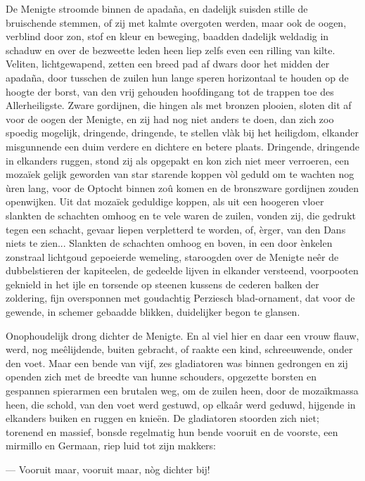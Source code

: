 \documentclass[a4paper, 12pt, oneside, dutch]{article}
\begin{document}
De Menigte stroomde binnen de apadaña, en dadelijk suisden stille de bruischende stemmen, of zij met kalmte overgoten werden, maar ook de oogen, verblind door zon, stof en kleur en beweging, baadden dadelijk weldadig in schaduw en over de bezweette leden heen liep zelfs even een rilling van kilte. Veliten, lichtgewapend, zetten een breed pad af dwars door het midden der apadaña, door tusschen de zuilen hun lange speren horizontaal te houden op de hoogte der borst, van den vrij gehouden hoofdingang tot de trappen toe des Allerheiligste. Zware gordijnen, die hingen als met bronzen plooien, sloten dit af voor de oogen der Menigte, en zij had nog niet anders te doen, dan zich zoo spoedig mogelijk, dringende, dringende, te stellen vlàk bij het heiligdom, elkander misgunnende een duim verdere en dichtere en betere plaats. Dringende, dringende in elkanders ruggen, stond zij als opgepakt en kon zich niet meer verroeren, een mozaïek gelijk geworden van star starende koppen vòl geduld om te wachten nog ùren lang, voor de Optocht binnen zoû komen en de bronszware gordijnen zouden openwijken. Uit dat mozaïek geduldige koppen, als uit een hoogeren vloer slankten de schachten omhoog en te vele waren de zuilen, vonden zij, die gedrukt tegen een schacht, gevaar liepen verpletterd te worden, of, èrger, van den Dans niets te zien... Slankten de schachten omhoog en boven, in een door ènkelen zonstraal lichtgoud gepoeierde wemeling, staroogden over de Menigte neêr de dubbelstieren der kapiteelen, de gedeelde lijven in elkander versteend, voorpooten geknield in het ijle en torsende op steenen kussens de cederen balken der zoldering, fijn oversponnen met goudachtig Perziesch blad-ornament, dat voor de gewende, in schemer gebaadde blikken, duidelijker begon te glansen.

Onophoudelijk drong dichter de Menigte. En al viel hier en daar een vrouw flauw, werd, nog meêlijdende, buiten gebracht, of raakte een kind, schreeuwende, onder den voet. Maar een bende van vijf, zes gladiatoren was binnen gedrongen en zij openden zich met de breedte van hunne schouders, opgezette borsten en gespannen spierarmen een brutalen weg, om de zuilen heen, door de mozaïkmassa heen, die schold, van den voet werd gestuwd, op elkaâr werd geduwd, hijgende in elkanders buiken en ruggen en knieën. De gladiatoren stoorden zich niet; torenend en massief, bonsde regelmatig hun bende vooruit en de voorste, een mirmillo en Germaan, riep luid tot zijn makkers:

--- Vooruit maar, vooruit maar, nòg dichter bij!
\end{document}
